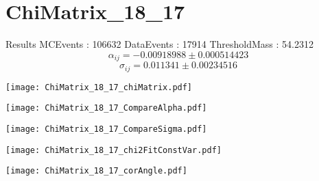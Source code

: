 \documentclass[a4paper,12pt]{article}
\begin{document}
\section{ChiMatrix\_18\_17}
\begin{minipage}{0.49\linewidth} Results \newline
MCEvents : 106632\newline
DataEvents : 17914 \newline
ThresholdMass : 54.2312\\
$$\alpha_{ij} = -0.00918988\pm 0.000514423$$
$$\sigma_{ij} = 0.011341\pm 0.00234516$$
\end{minipage}\hfill
\begin{minipage}{0.49\linewidth} 
\texttt{[image: ChiMatrix\_18\_17\_chiMatrix.pdf]}\\
\end{minipage}
\hfill
\begin{minipage}{0.49\linewidth} 
\texttt{[image: ChiMatrix\_18\_17\_CompareAlpha.pdf]}\\
\end{minipage}
\hfill
\begin{minipage}{0.49\linewidth} 
\texttt{[image: ChiMatrix\_18\_17\_CompareSigma.pdf]}\\
\end{minipage}
\begin{minipage}{0.49\linewidth} 
\texttt{[image: ChiMatrix\_18\_17\_chi2FitConstVar.pdf]}\\
\end{minipage}
\hfill
\begin{minipage}{0.49\linewidth} 
\texttt{[image: ChiMatrix\_18\_17\_corAngle.pdf]}\\
\end{minipage}
\end{document}
